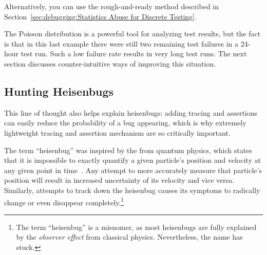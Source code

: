{{	Alternatively, you can use the rough-and-ready method described in
	Section~\ref{sec:debugging:Statistics Abuse for Discrete Testing}.
}\QuickQuizEndB
%
\QuickQuizEndE
}

The Poisson distribution is a powerful tool for analyzing test results,
but the fact is that in this last example there were still two remaining
test failures in a 24-hour test run.
Such a low failure rate results in very long test runs.
The next section discusses counter-intuitive ways of improving this situation.

\subsection{Hunting Heisenbugs}
\label{sec:debugging:Hunting Heisenbugs}

This line of thought also helps explain heisenbugs:
adding tracing and assertions can easily reduce the probability
of a bug appearing, which
is why extremely lightweight tracing and assertion mechanism are
so critically important.

The term ``heisenbug'' was inspired by the 
 from quantum physics, which states that
it is impossible to
exactly quantify a given particle's position and velocity at any given
point in time~\cite{WeinerHeisenberg1927Uncertain}.
Any attempt to more accurately measure that particle's position will
result in increased uncertainty of its velocity and vice versa.
Similarly, attempts to track down
the heisenbug causes its symptoms to radically change or even disappear
completely.\footnote{
	The term ``heisenbug'' is a misnomer, as most heisenbugs are
	fully explained by the \emph{observer effect} from classical
	physics.
	Nevertheless, the name has stuck.}

